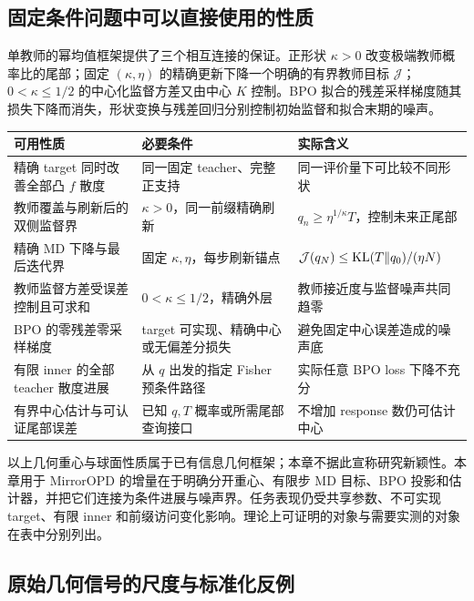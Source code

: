 \subsection{固定条件问题中可以直接使用的性质}

单教师的幂均值框架提供了三个相互连接的保证。正形状 $\kappa>0$ 改变极端教师概率比的尾部；固定 $(\kappa,\eta)$ 的精确更新下降一个明确的有界教师目标 $\mathcal J$；$0<\kappa\le1/2$ 的中心化监督方差又由中心 $K$ 控制。BPO 拟合的残差采样梯度随其损失下降而消失，形状变换与残差回归分别控制初始监督和拟合末期的噪声。

\begin{center}
\small
\begin{tabular}{p{46mm}p{54mm}p{45mm}}
\toprule
可用性质 & 必要条件 & 实际含义\\
\midrule
精确 target 同时改善全部凸 $f$ 散度 & 同一固定 teacher、完整正支持 & 同一评价量下可比较不同形状\\
教师覆盖与刷新后的双侧监督界 & $\kappa>0$，同一前缀精确刷新 & $q_n\ge\eta^{1/\kappa}T$，控制未来正尾部\\
精确 MD 下降与最后迭代界 & 固定 $\kappa,\eta$，每步刷新锚点 & $\mathcal J(q_N)\le\operatorname{KL}(T\Vert q_0)/(\eta N)$\\
教师监督方差受误差控制且可求和 & $0<\kappa\le1/2$，精确外层 & 教师接近度与监督噪声共同趋零\\
BPO 的零残差零采样梯度 & target 可实现、精确中心或无偏差分损失 & 避免固定中心误差造成的噪声底\\
有限 inner 的全部 teacher 散度进展 & 从 $q$ 出发的指定 Fisher 预条件路径 & 实际任意 BPO loss 下降不充分\\
有界中心估计与可认证尾部误差 & 已知 $q,T$ 概率或所需尾部查询接口 & 不增加 response 数仍可估计中心\\
\bottomrule
\end{tabular}
\end{center}

以上几何重心与球面性质属于已有信息几何框架；本章不据此宣称研究新颖性。本章用于 MirrorOPD 的增量在于明确分开重心、有限步 MD 目标、BPO 投影和估计器，并把它们连接为条件进展与噪声界。任务表现仍受共享参数、不可实现 target、有限 inner 和前缀访问变化影响。理论上可证明的对象与需要实测的对象在表中分别列出。

\subsection{原始几何信号的尺度与标准化反例}

